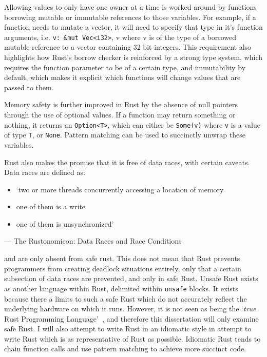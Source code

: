 Allowing values to only have one owner at a time is worked around by functions borrowing mutable or immutable references to those variables. For example, if a function needs to mutate a vector, it will need to specify that type in it's function arguments, i.e. \texttt{v: \&mut Vec<i32>}, v where v is of the type of a borrowed mutable reference to a vector containing 32 bit integers.
This requirement also highlights how Rust's borrow checker is reinforced by a strong type system, which requires the function parameter to be of a certain type, and immutability by default, which makes it explicit which functions will change values that are passed to them.

Memory safety is further improved in Rust by the absence of null pointers through the use of optional values. If a function may return something or nothing, it returns an \texttt{Option<T>}, which can either be \texttt{Some(v)} where \texttt{v} is a value of type \texttt{T}, or \texttt{None}. Pattern matching can be used to succinctly unwrap these variables.

Rust also makes the promise that it is free of data races, with certain caveats. Data races are defined as:
\begin{itemize}
    \item `two or more threads concurrently accessing a location of memory
    \item one of them is a write
    \item one of them is unsynchronized'
\end{itemize}
\begin{flushright}
--- The Rustonomicon: Data Races and Race Conditions~\cite{NomRace}
\end{flushright}

and are only absent from safe rust. This does not mean that Rust prevents programmers from creating deadlock situations entirely, only that a certain subsection of data races are prevented, and only in safe Rust. Unsafe Rust exists as another language within Rust, delimited within \texttt{unsafe} blocks. It exists because there a limits to such a safe Rust which do not accurately reflect the underlying hardware on which it runs. However, it is not seen as being the `\textit{true} Rust Programming Language'~\cite{NomSafe}, and therefore this dissertation will only examine safe Rust. I will also attempt to write Rust in an idiomatic style in attempt to write Rust which is as representative of Rust as possible. Idiomatic Rust tends to chain function calls and use pattern matching to achieve more succinct code.

